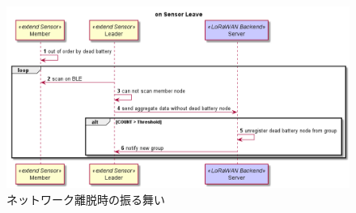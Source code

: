\begin{figure}[]
    \begin{center}
    \includegraphics[width=14cm]{figures/グループ化_ネットワーク離脱時.png}
    \caption{ネットワーク離脱時の振る舞い}
    \label{fig:group_on_leave}
    \end{center}
\end{figure}